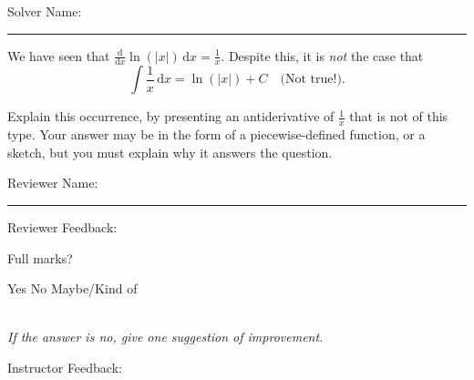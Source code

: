 \documentclass[12pt]{exam}
\newcommand{\dl}{\mathrm{d}}
\begin{document}
\pagestyle{headandfoot}
\firstpageheadrule

Solver Name:\enspace\rule{5cm}{0.8pt}

\begin{questions}
\question

We have seen that $\frac{\dl}{\dl x} \ln(\lvert x \rvert) \,\dl x = \frac1x$. Despite this, it is \emph{not} the case that
\[\int \frac1x \,\dl x = \ln(\lvert x \rvert) + C \quad \text{(Not true!)}.\]

Explain this occurrence, by presenting an antiderivative of $\frac1x$ that is not of this type. Your answer may be in the form of a piecewise-defined function, or a sketch, but you must explain why it answers the question.

\end{questions}

Reviewer Name:\enspace\rule{5cm}{0.8pt}

\begin{questions}
\question
Reviewer Feedback:

Full marks? \begin{oneparcheckboxes}
\choice Yes
\choice No
\choice Maybe/Kind of
\end{oneparcheckboxes}\\
\textit{If the answer is no, give one suggestion of improvement.}

\question

Instructor Feedback:

\end{questions}
\end{document}
